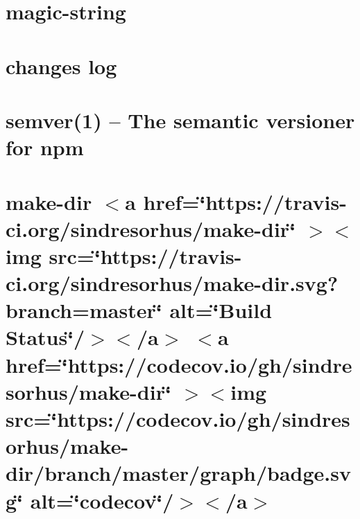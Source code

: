 \documentclass[twoside]{book}
\newcommand{\+}{\discretionary{\mbox{\scriptsize$\hookleftarrow$}}{}{}}
\begin{document}
\chapter{magic-\/string}
\label{md__c___users_vaishnavi_jadhav__desktop__developer_code_mean_stack_example_client_node_modules_magic_string__r_e_a_d_m_e}

\chapter{changes log}
\label{md__c___users_vaishnavi_jadhav__desktop__developer_code_mean_stack_example_client_node_modules_me4c03135eaca69d452f45c4afb925490}

\chapter{semver(1) -- The semantic versioner for npm}
\label{md__c___users_vaishnavi_jadhav__desktop__developer_code_mean_stack_example_client_node_modules_mb6af673bb741f70e40626aff4491ca61}

\chapter{make-\/dir \texorpdfstring{$<$}{<}a href=\char`\"{}https\+://travis-\/ci.\+org/sindresorhus/make-\/dir\char`\"{} \texorpdfstring{$>$}{>}\texorpdfstring{$<$}{<}img src=\char`\"{}https\+://travis-\/ci.\+org/sindresorhus/make-\/dir.\+svg?branch=master\char`\"{} alt=\char`\"{}\+Build Status\char`\"{}/\texorpdfstring{$>$}{>}\texorpdfstring{$<$}{<}/a\texorpdfstring{$>$}{>} \texorpdfstring{$<$}{<}a href=\char`\"{}https\+://codecov.\+io/gh/sindresorhus/make-\/dir\char`\"{} \texorpdfstring{$>$}{>}\texorpdfstring{$<$}{<}img src=\char`\"{}https\+://codecov.\+io/gh/sindresorhus/make-\/dir/branch/master/graph/badge.\+svg\char`\"{} alt=\char`\"{}codecov\char`\"{}/\texorpdfstring{$>$}{>}\texorpdfstring{$<$}{<}/a\texorpdfstring{$>$}{>}}
\label{md__c___users_vaishnavi_jadhav__desktop__developer_code_mean_stack_example_client_node_modules_make_dir_readme}

\end{document}
